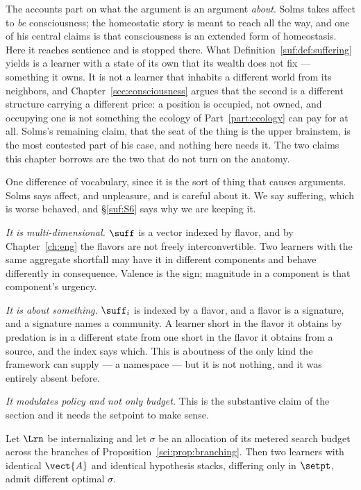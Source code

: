 \begin{remark}
The accounts part on what the argument is an argument \emph{about}.
Solms takes affect to \emph{be} consciousness; the homeostatic story is
meant to reach all the way, and one of his central claims is that
consciousness is an extended form of homeostasis.
Here it reaches sentience and is stopped there.
What Definition~\ref{suf:def:suffering} yields is a learner with a state
of its own that its wealth does not fix --- something it owns.
It is not a learner that inhabits a different world from its neighbors,
and Chapter~\ref{sec:consciousness} argues that the second is a
different structure carrying a different price: a position is occupied,
not owned, and occupying one is not something the ecology of
Part~\ref{part:ecology} can pay for at all.
Solms's remaining claim, that the seat of the thing is the upper
brainstem, is the most contested part of his case, and nothing here
needs it.
The two claims this chapter borrows are the two that do not turn on the
anatomy.

One difference of vocabulary, since it is the sort of thing that causes
arguments.
Solms says affect, and unpleasure, and is careful about it.
We say suffering, which is worse behaved, and \S\ref{suf:S6} says why we
are keeping it.
\end{remark}

\emph{It is multi-dimensional.}
$\suff$ is a vector indexed by flavor, and by Chapter~\ref{ch:eng} the
flavors are not freely interconvertible.
Two learners with the same aggregate shortfall may have it in different
components and behave differently in consequence.
Valence is the sign; magnitude in a component is that component's
urgency.

\emph{It is about something.}
$\suff_i$ is indexed by a flavor, and a flavor is a signature, and a
signature names a community.
A learner short in the flavor it obtains by predation is in a different
state from one short in the flavor it obtains from a source, and the
index says which.
This is aboutness of the only kind the framework can supply --- a
namespace --- but it is not nothing, and it was entirely absent before.

\emph{It modulates policy and not only budget.}
This is the substantive claim of the section and it needs the setpoint to
make sense.

\begin{proposition}
\label{suf:prop:policy}
Let $\Lrn$ be internalizing and let $\sigma$ be an allocation of its
metered search budget across the branches of
Proposition~\ref{sci:prop:branching}.
Then two learners with identical $\vect{A}$ and identical hypothesis
stacks, differing only in $\setpt$, admit different optimal $\sigma$.
\end{proposition}

